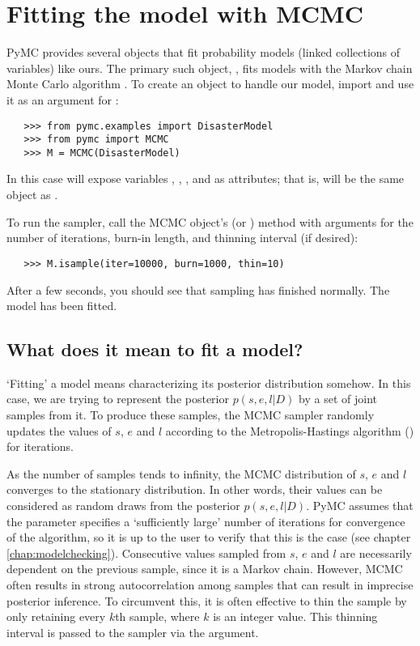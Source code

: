 \section{Fitting the model with MCMC}

PyMC provides several objects that fit probability models (linked collections of variables) like ours. The primary such object, , fits models with the Markov chain Monte Carlo algorithm \cite{Gamerman:1997tb}. To create an  object to handle our model, import  and use it as an argument for :
\begin{verbatim}
   >>> from pymc.examples import DisasterModel
   >>> from pymc import MCMC
   >>> M = MCMC(DisasterModel)
\end{verbatim}
In this case  will expose variables , , ,  and  as attributes; that is,  will be the same object as .

To run the sampler, call the MCMC object's  (or ) method with arguments for the number of iterations, burn-in length, and thinning interval (if desired):
\begin{verbatim}
   >>> M.isample(iter=10000, burn=1000, thin=10)
\end{verbatim}
After a few seconds, you should see that sampling has finished normally. The model has been fitted.

\subsection{What does it mean to fit a model?}

`Fitting' a model means characterizing its posterior distribution somehow. In this case, we are trying to represent the posterior $p(s,e,l|D)$ by a set of joint samples from it. To produce these samples, the MCMC sampler randomly updates the values of $s$, $e$ and $l$ according to the Metropolis-Hastings algorithm (\cite{gelman}) for   iterations.

As the number of samples tends to infinity, the MCMC distribution of $s$, $e$
and $l$ converges to the stationary distribution. In other words, their
values can be considered as random draws from the posterior $p(s,e,l|D)$.
PyMC assumes that the  parameter specifies a `sufficiently large'
number of iterations for convergence of the algorithm, so it is up to the user
to verify
that this is the case (see chapter \ref{chap:modelchecking}). Consecutive values
sampled from $s$, $e$ and $l$ are necessarily dependent on the previous sample,
since it is a Markov chain. However, MCMC often results in strong
autocorrelation among samples that can result in imprecise posterior inference.
To circumvent this, it is often effective to thin the sample by only retaining
every $k$th sample, where $k$ is an integer value. This thinning interval is
passed to the sampler via the  argument.

